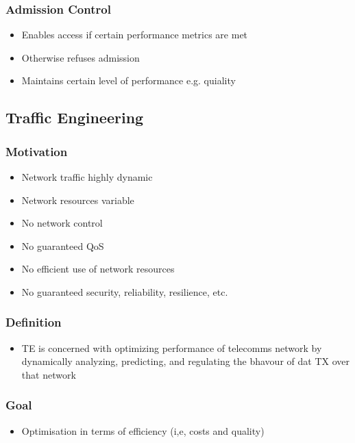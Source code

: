 \subsubsection{Admission Control}
\begin{itemize}
	\item Enables access if certain performance metrics are met
	\item Otherwise refuses admission
	\item Maintains certain level of performance e.g. quiality
\end{itemize}
\subsection{Traffic Engineering}
\subsubsection{Motivation}
\begin{itemize}
	\item Network traffic highly dynamic
	\item Network resources variable
	\item No network control
	\item No guaranteed QoS
	\item No efficient use of network resources
	\item No guaranteed security, reliability, resilience, etc.
\end{itemize}
\subsubsection{Definition}
\begin{itemize}
	\item TE is concerned with optimizing performance of telecomms network
		by dynamically analyzing, predicting, and regulating the bhavour
		of dat TX over that network
\end{itemize}
\subsubsection{Goal}
\begin{itemize}
	\item Optimisation in terms of efficiency (i,e, costs and quality)
\end{itemize}
